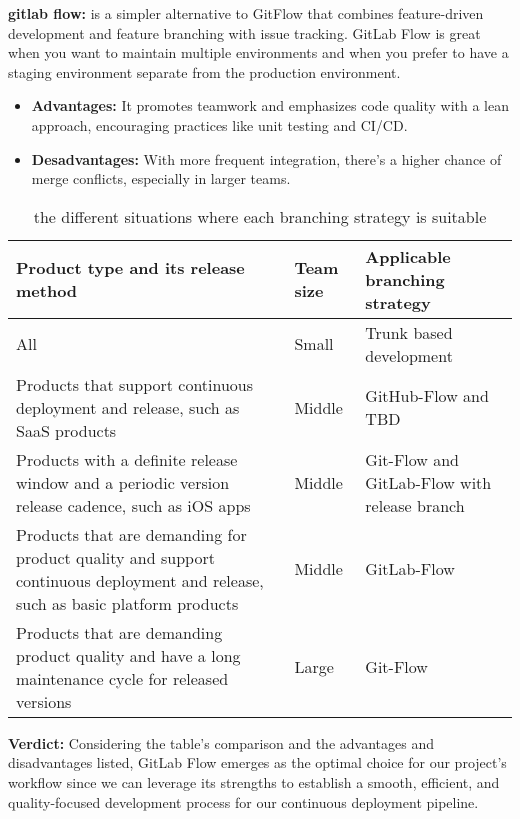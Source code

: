 \textbf{gitlab flow:} is a simpler alternative to GitFlow that combines feature-driven development and feature branching with issue tracking. GitLab Flow is great when you want to maintain multiple environments and when you prefer to have a staging environment separate from the production environment.
\begin{itemize}
    \item \textbf{Advantages:} It promotes teamwork and emphasizes code quality with a lean approach, encouraging practices like unit testing and CI/CD.
    \item \textbf{Desadvantages:} With more frequent integration, there's a higher chance of merge conflicts, especially in larger teams.
\end{itemize}
\begin{longtable}[c]{
    |p{}
    |p{}|
    p{}|
    }
    \caption{the different situations where each branching strategy is suitable}
    \label{tab:gitStratagyTable}
    \\ \hline

    Product type and its release method                                                                                            & Team size & Applicable branching strategy                \\ \hline
    All                                                                                                                            & Small     & Trunk based development                      \\ \hline
    Products that support continuous deployment and release, such as SaaS products                                                 & Middle    & GitHub-Flow and TBD                          \\ \hline
    Products with a definite release window and a periodic version release cadence, such as iOS apps                               & Middle    & Git-Flow and GitLab-Flow with release branch \\ \hline
    Products that are demanding for product quality and support continuous deployment and release, such as basic platform products & Middle    & GitLab-Flow                                  \\ \hline
    Products that are demanding product quality and have a long maintenance cycle for released versions                            & Large     & Git-Flow                                     \\ \hline
\end{longtable}
\par
\textbf{Verdict:} Considering the table's comparison and the advantages and disadvantages listed, GitLab Flow emerges as the optimal choice for our project's workflow since we can leverage its strengths to establish a smooth, efficient, and quality-focused development process for our continuous deployment pipeline.
